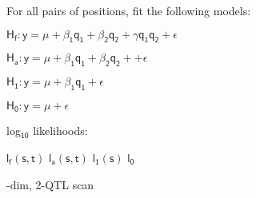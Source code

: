 \documentclass[12pt]{article}
\newcommand{\headsize}{\fontsize{35}{35} \selectfont}
\newcommand{\smallsize}{\fontsize{25}{30} \selectfont}
\begin{document}
\hfill \begin{minipage}[t]{10in}
For all pairs of positions, fit the following models:

\vspace{10mm}

\hfill
\begin{minipage}{9in}
{\color{myblue}
$\mathsf{\text{H}_f: y = \mu + \beta_1 q_1 + \beta_2 q_2 +
      \gamma q_1 q_2 + \epsilon}$

\vspace{5mm}

$\mathsf{\text{H}_a: y = \mu + \beta_1 q_1 + \beta_2 q_2 +
      + \epsilon}$

\vspace{5mm}

$\mathsf{\text{H}_1: y = \mu + \beta_1 q_1 + \epsilon}$

\vspace{5mm}

$\mathsf{\text{H}_0: y = \mu + \epsilon}$

}
\end{minipage}

\vspace{20mm}

log$_{\mathsf{10}}$ likelihoods:

\vspace{5mm}

\hfill
\begin{minipage}{9in}
{\color{myblue}

$\mathsf{l_f(s,t)}$ \hspace{2cm}
$\mathsf{l_a(s,t)}$ \hspace{2cm}
$\mathsf{l_1(s)}$ \hspace{2cm}
$\mathsf{l_0}$ \hspace{2cm}
}
\end{minipage}


\end{minipage}


\newpage

\headsize \color{myyellow}
\hfill \begin{minipage}{5.75in}
-dim, 2-QTL scan
\end{minipage}

\vspace{2cm}

\color{mywhite} \smallsize
\end{document}
